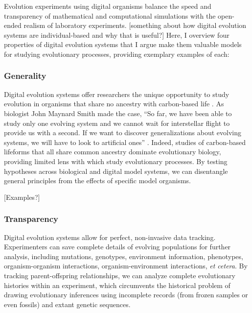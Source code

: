 Evolution experiments using digital organisms balance the speed and transparency of mathematical and computational simulations with the open-ended realism of laboratory experiments. 
[something about how digital evolution systems are individual-based and why that is useful?]
Here, I overview four properties of digital evolution systems that I argue make them valuable models for studying evolutionary processes, providing exemplary examples of each:

\subsubsection{Generality}

Digital evolution systems offer researchers the unique opportunity to study evolution in organisms that share no ancestry with carbon-based life \citep{wilke_biology_2002}.
As biologist John Maynard Smith made the case, ``So far, we have been able to study only one evolving system and we cannot wait for interstellar flight to provide us with a second. If we want to discover generalizations about evolving systems, we will have to look to artificial ones'' \citep{maynard_smith_byte-sized_1992}.
Indeed, studies of carbon-based lifeforms that all share common ancestry dominate evolutionary biology, providing limited lens with which study evolutionary processes.
By testing hypotheses across biological and digital model systems, we can disentangle general principles from the effects of specific model organisms.  

[Examples?]


\subsubsection{Transparency}


Digital evolution systems allow for perfect, non-invasive data tracking.
Experimenters can save complete details of evolving populations for further analysis, including mutations, genotypes, environment information, phenotypes, organism-organism interactions, organism-environment interactions, \textit{et cetera}.
By tracking parent-offspring relationships, we can analyze complete evolutionary histories within an experiment, which circumvents the historical problem of drawing evolutionary inferences using incomplete records (from frozen samples or even fossils) and extant genetic sequences.

